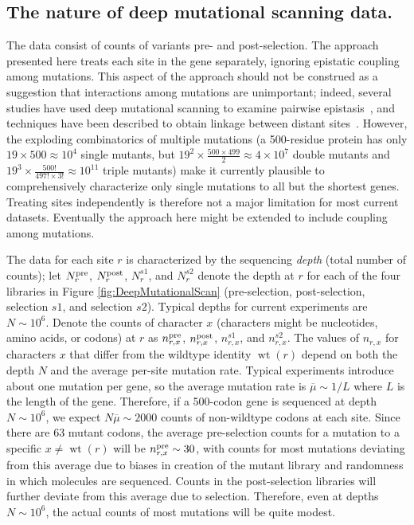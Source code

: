 \documentclass[twocolumn]{bmcart}%
\begin{document}
\subsection*{The nature of deep mutational scanning data.}
The data consist of counts of variants pre- and post-selection. The approach presented here treats each site in the gene separately, ignoring epistatic coupling among mutations. This aspect of the approach should not be construed as a suggestion that interactions among mutations are unimportant; indeed, several studies have used deep mutational scanning to examine pairwise epistasis~\cite{olson2014comprehensive,araya2012fundamental,bank2015systematic}, and techniques have been described to obtain linkage between distant sites~\cite{hiatt2010parallel,wu2014hiv}. However, the exploding combinatorics of multiple mutations (a 500-residue protein has only $19 \times 500 \approx 10^4$ single mutants, but $19^2 \times \frac{500 \times 499}{2} \approx 4 \times 10^7$  double mutants and $19^3 \times \frac{500!}{497! \times 3!} \approx 10^{11}$ triple mutants) make it currently plausible to comprehensively characterize only single mutations to all but the shortest genes. Treating sites independently is therefore not a major limitation for most current datasets. Eventually the approach here might be extended to include coupling among mutations.

The data for each site $r$ is characterized by the sequencing \emph{depth} (total number of counts); let $N_r^{\rm{pre}}$, $N_r^{\rm{post}}$, $N_r^{s1}$, and $N_r^{s2}$ denote the depth at $r$ for each of the four libraries in Figure \ref{fig:DeepMutationalScan} (pre-selection, post-selection, selection $s1$, and selection $s2$). Typical depths for current experiments are $N \sim 10^6$. Denote the counts of character $x$ (characters might be nucleotides, amino acids, or codons) at $r$ as $n_{r,x}^{\rm{pre}}$, $n_{r,x}^{\rm{post}}$, $n_{r,x}^{s1}$, and $n_{r,x}^{s2}$. The values of $n_{r,x}$ for characters $x$ that differ from the wildtype identity $\operatorname{wt}\left(r\right)$ depend on both the depth $N$ and the average per-site mutation rate. Typical experiments introduce about one mutation per gene, so the average mutation rate is $\overline{\mu} \sim 1/L$ where $L$ is the length of the gene. Therefore, if a 500-codon gene is sequenced at depth $N \sim 10^6$, we expect $N \overline{\mu} \sim 2000$ counts of non-wildtype codons at each site. Since there are 63 mutant codons, the average pre-selection counts for a mutation to a specific $x \ne \operatorname{wt}\left(r\right)$ will be $n_{r,x}^{\rm{pre}} \sim 30$, with counts for most mutations deviating from this average due to biases in creation of the mutant library and randomness in which molecules are sequenced. Counts in the post-selection libraries will further deviate from this average due to selection. Therefore, even at depths $N \sim 10^6$, the actual counts of most mutations will be quite modest.
\end{document}
